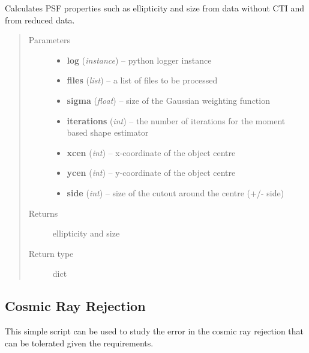 \documentclass[a4paper,11pt,english]{sphinxmanual}
\begin{document}
\begin{fulllineitems}
\label{reduction:analysis.testCTIcorrection.testCTIcorrection}
Calculates PSF properties such as ellipticity and size from data without CTI and from
reduced data.
\begin{quote}\begin{description}
\item[{Parameters}] \leavevmode\begin{itemize}
\item {} 
\textbf{log} (\emph{instance}) -- python logger instance

\item {} 
\textbf{files} (\emph{list}) -- a list of files to be processed

\item {} 
\textbf{sigma} (\emph{float}) -- size of the Gaussian weighting function

\item {} 
\textbf{iterations} (\emph{int}) -- the number of iterations for the moment based shape estimator

\item {} 
\textbf{xcen} (\emph{int}) -- x-coordinate of the object centre

\item {} 
\textbf{ycen} (\emph{int}) -- y-coordinate of the object centre

\item {} 
\textbf{side} (\emph{int}) -- size of the cutout around the centre (+/- side)

\end{itemize}

\item[{Returns}] \leavevmode
ellipticity and size

\item[{Return type}] \leavevmode
dict

\end{description}\end{quote}

\end{fulllineitems}

\label{reduction:module-analysis.cosmicrayCalibration}

\subsection{Cosmic Ray Rejection}
\label{reduction:cosmic-ray-rejection}
This simple script can be used to study the error in the cosmic ray rejection that can be tolerated given the
requirements.
\end{document}
